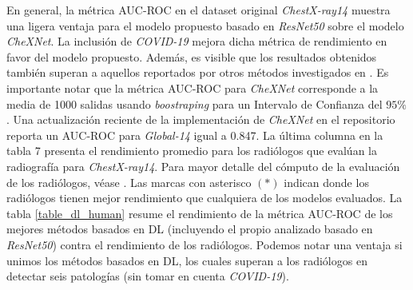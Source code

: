 En general, la métrica AUC-ROC en el dataset original \textit{ChestX-ray14} muestra una ligera ventaja
para el modelo propuesto basado en \textit{ResNet50} sobre el modelo \textit{CheXNet}. La inclusión de
\textit{COVID-19} mejora dicha métrica de rendimiento en favor del modelo propuesto. Además, es visible
que los resultados obtenidos también superan a aquellos reportados por otros métodos investigados en
\cite{baltruschat2019comparison}. Es importante notar que la métrica AUC-ROC para \textit{CheXNet}
corresponde a la media de 1000 salidas usando \textit{boostraping} para un Intervalo de Confianza del
$95\%$ \cite{rajpurkar2018deep}. Una actualización reciente de la implementación de \textit{CheXNet} en
el repositorio \cite{chexnet_code} reporta un AUC-ROC para \textit{Global-14} igual a 0.847. La última
columna en la tabla 7 presenta el rendimiento promedio para los radiólogos que evalúan la radiografía
para \textit{ChestX-ray14}. Para mayor detalle del cómputo de la evaluación de los radiólogos, véase
\cite{rajpurkar2018deep}. Las marcas con asterisco $(*)$ indican donde los radiólogos tienen mejor
rendimiento que cualquiera de los modelos evaluados. La tabla \ref{table_dl_human} resume el rendimiento
de la métrica AUC-ROC de los mejores métodos basados en DL (incluyendo el propio analizado basado en
\textit{ResNet50}) contra el rendimiento de los radiólogos. Podemos notar una ventaja si unimos los
métodos basados en DL, los cuales superan a los radiólogos en detectar seis patologías (sin tomar en
cuenta \textit{COVID-19}).


